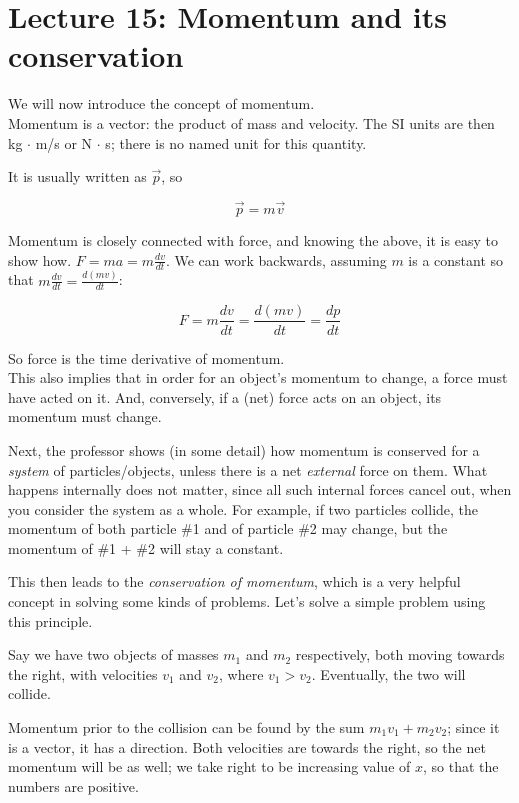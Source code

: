 
\section{Lecture 15: Momentum and its conservation}

We will now introduce the concept of momentum.\\
Momentum is a vector: the product of mass and velocity. The SI units are then kg $\cdot$ m/s or N $\cdot$ s; there is no named unit for this quantity.

It is usually written as $\vec{p}$, so

\begin{equation}
\vec{p} = m \vec{v}
\end{equation}

Momentum is closely connected with force, and knowing the above, it is easy to show how. $\displaystyle F = m a = m \frac{dv}{dt}$. We can work backwards, assuming $m$ is a constant so that $m \frac{dv}{dt} = \frac{d(mv)}{dt}$:

\begin{equation}
F = m \frac{dv}{dt} = \frac{d(mv)}{dt} = \frac{dp}{dt}
\end{equation}

So force is the time derivative of momentum.\\
This also implies that in order for an object's momentum to change, a force must have acted on it. And, conversely, if a (net) force acts on an object, its momentum must change.

Next, the professor shows (in some detail) how momentum is conserved for a \emph{system} of particles/objects, unless there is a net \emph{external} force on them. What happens internally does not matter, since all such internal forces cancel out, when you consider the system as a whole. For example, if two particles collide, the momentum of both particle \#1 and of particle \#2 may change, but the momentum of \#1 + \#2 will stay a constant.

This then leads to the \emph{conservation of momentum}, which is a very helpful concept in solving some kinds of problems. Let's solve a simple problem using this principle.

Say we have two objects of masses $m_1$ and $m_2$ respectively, both moving towards the right, with velocities $v_1$ and $v_2$, where $v_1 > v_2$. Eventually, the two will collide.

Momentum prior to the collision can be found by the sum $m_1 v_1 + m_2 v_2$; since it is a vector, it has a direction. Both velocities are towards the right, so the net momentum will be as well; we take right to be increasing value of $x$, so that the numbers are positive.

